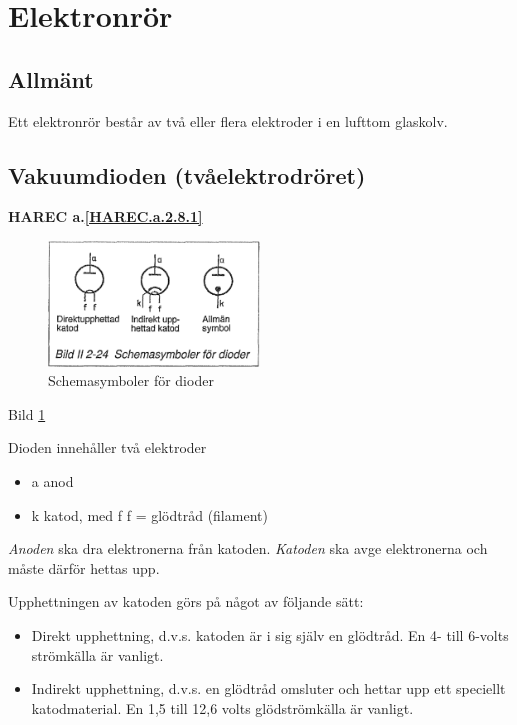 \section{Elektronrör}
\label{elektronrör}

\subsection{Allmänt}

Ett elektronrör består av två eller flera elektroder i en lufttom glaskolv.

\subsection{Vakuumdioden (tvåelektrodröret)}
\textbf{HAREC a.\ref{HAREC.a.2.8.1}\label{myHAREC.a.2.8.1}}
\label{vakuumdioden}

\begin{figure}
\includegraphics[width=0.5\textwidth]{images/bild_2_2-24}
\caption{Schemasymboler för dioder}
\label{fig:BildII2-24}
\end{figure}

Bild \ref{fig:BildII2-24}

Dioden innehåller två elektroder
\begin{itemize}
\item a anod
\item k katod, med f f = glödtråd (filament)
\end{itemize}

\emph{Anoden} ska dra elektronerna från katoden.
\emph{Katoden} ska avge elektronerna och måste därför hettas upp.

Upphettningen av katoden görs på något av följande sätt:
\begin{itemize}
\item Direkt upphettning, d.v.s. katoden är i sig själv en glödtråd. En 4-
  till 6-volts strömkälla är vanligt.
\item Indirekt upphettning, d.v.s. en glödtråd omsluter och hettar upp ett
  speciellt katodmaterial. En 1,5 till 12,6 volts glödströmkälla är vanligt.
\end{itemize}

